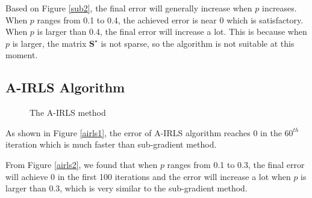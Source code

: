 \documentclass[conference]{IEEEtran}
\begin{document}
Based on Figure \ref{sub2}, the final error will generally increase when $p$ increases. When $p$ ranges from 0.1 to 0.4, the achieved error is near 0 which is satisfactory. When $p$ is larger than 0.4, the final error will increase a lot. This is because when $p$ is larger, the matrix $\boldsymbol{S}^{\star}$ is not sparse, so the algorithm is not suitable at this moment.
\subsection{A-IRLS Algorithm}

\begin{figure}[htbp]
    \centering
    \quad
    \caption{The A-IRLS method}
    \label{airls}
  \end{figure}

As shown in Figure \ref{airls1}, the error of A-IRLS algorithm reaches 0 in the $60^{th}$ iteration which is much faster than sub-gradient method. 

From Figure \ref{airls2}, we found that when $p$ ranges from 0.1 to 0.3, the final error will achieve 0 in the first 100 iterations and the error will increase a lot when $p$ is larger than 0.3, which is very similar to the sub-gradient method.
\end{document}
